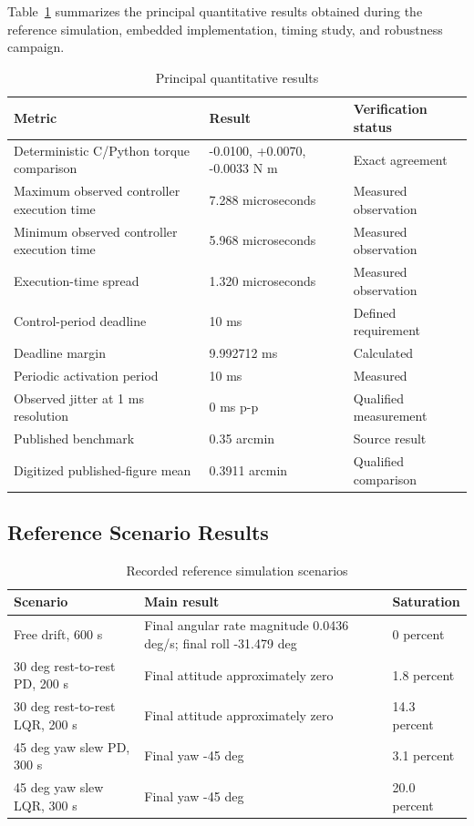\documentclass[11pt,a4paper]{article}
\begin{document}
Table~\ref{tab:baseline-results} summarizes the principal quantitative results obtained during the reference simulation, embedded implementation, timing study, and robustness campaign.

\begin{table}[H]
\centering
\caption{Principal quantitative results}
\label{tab:baseline-results}
\begin{tabular}{p{}p{}p{}}
\toprule
Metric & Result & Verification status \\
\midrule
Deterministic C/Python torque comparison & -0.0100, +0.0070, -0.0033 N m & Exact agreement \\
Maximum observed controller execution time & 7.288 microseconds & Measured observation \\
Minimum observed controller execution time & 5.968 microseconds & Measured observation \\
Execution-time spread & 1.320 microseconds & Measured observation \\
Control-period deadline & 10 ms & Defined requirement \\
Deadline margin & 9.992712 ms & Calculated \\
Periodic activation period & 10 ms & Measured \\
Observed jitter at 1 ms resolution & 0 ms p-p & Qualified measurement \\
Published benchmark & 0.35 arcmin & Source result \\
Digitized published-figure mean & 0.3911 arcmin & Qualified comparison \\
\bottomrule
\end{tabular}
\end{table}

\subsection{Reference Scenario Results}

\begin{table}[H]
\centering
\caption{Recorded reference simulation scenarios}
\label{tab:scenario-results}
\begin{tabular}{p{}p{}p{}}
\toprule
Scenario & Main result & Saturation \\
\midrule
Free drift, 600 s & Final angular rate magnitude 0.0436 deg/s; final roll -31.479 deg & 0 percent \\
30 deg rest-to-rest PD, 200 s & Final attitude approximately zero & 1.8 percent \\
30 deg rest-to-rest LQR, 200 s & Final attitude approximately zero & 14.3 percent \\
45 deg yaw slew PD, 300 s & Final yaw -45 deg & 3.1 percent \\
45 deg yaw slew LQR, 300 s & Final yaw -45 deg & 20.0 percent \\
\bottomrule
\end{tabular}
\end{table}
\end{document}
